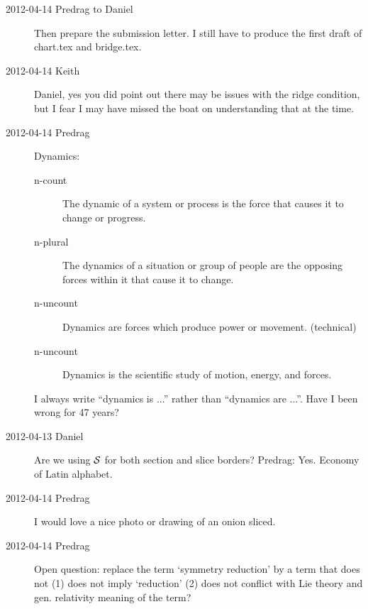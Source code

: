 \begin{description}
\item[2012-04-14 Predrag to Daniel] Then prepare the submission letter. I
still have to produce the first draft of chart.tex and bridge.tex.

\item[2012-04-14 Keith] Daniel, yes you did point out there may be issues
with the ridge condition, but I fear I may have missed the boat on
understanding that at the time.


\item[2012-04-14 Predrag]       \toCB
{}
{Dynamics}:

\begin{description}
\item[n-count]  The dynamic of a system or process is the force that
                causes it to change or progress.
\item[n-plural] The dynamics of a situation or group of people are the
                opposing forces within it that cause it to change.
\item[n-uncount]  Dynamics are forces which produce power or movement.    (technical)
\item[n-uncount]  Dynamics is the scientific study of motion, energy, and forces.
\end{description}

I always write ``dynamics is ...'' rather than ``dynamics are ...''. Have I been wrong for 47 years?

\item[2012-04-13 Daniel]
Are we using $\cal{S}$ for both section and slice borders? Predrag: Yes. Economy of Latin alphabet.

\item[2012-04-14  Predrag]
I would love a nice photo or drawing of an onion sliced.

\item[2012-04-14 Predrag]       \toCB
Open question: replace the term `symmetry reduction' by a term that does not
    (1) does not imply `reduction' (2) does not conflict with Lie theory
    and gen. relativity meaning of the term?


\end{description}

